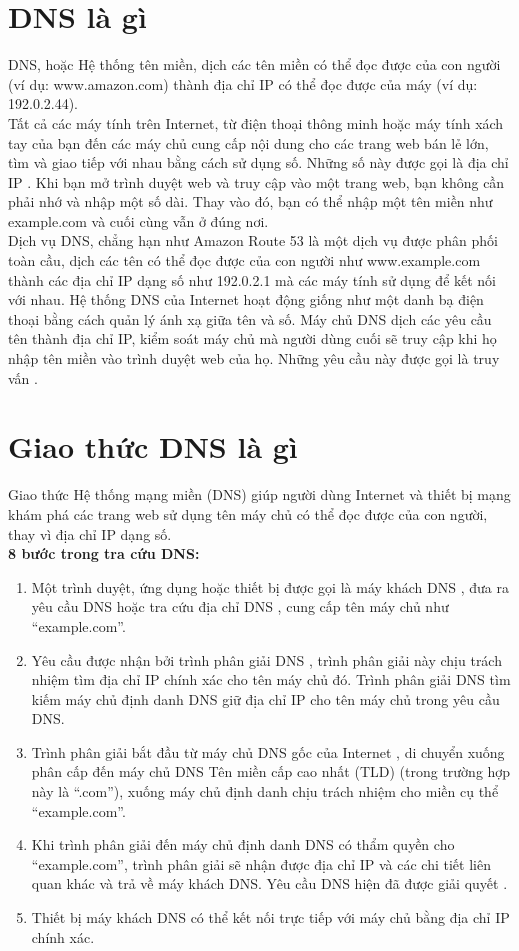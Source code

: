 \documentclass{article}
\begin{document}
\section{DNS là gì}
DNS, hoặc Hệ thống tên miền, dịch các tên miền có thể đọc được của con người (ví dụ: www.amazon.com) thành địa chỉ IP có thể đọc được của máy (ví dụ: 192.0.2.44).\\

\noindent Tất cả các máy tính trên Internet, từ điện thoại thông minh hoặc máy tính xách tay của bạn đến các máy chủ cung cấp nội dung cho các trang web bán lẻ lớn, tìm và giao tiếp với nhau bằng cách sử dụng số. Những số này được gọi là địa chỉ IP . Khi bạn mở trình duyệt web và truy cập vào một trang web, bạn không cần phải nhớ và nhập một số dài. Thay vào đó, bạn có thể nhập một tên miền như example.com và cuối cùng vẫn ở đúng nơi.\\

\noindent Dịch vụ DNS, chẳng hạn như Amazon Route 53 là một dịch vụ được phân phối toàn cầu, dịch các tên có thể đọc được của con người như www.example.com thành các địa chỉ IP dạng số như 192.0.2.1 mà các máy tính sử dụng để kết nối với nhau. Hệ thống DNS của Internet hoạt động giống như một danh bạ điện thoại bằng cách quản lý ánh xạ giữa tên và số. Máy chủ DNS dịch các yêu cầu tên thành địa chỉ IP, kiểm soát máy chủ mà người dùng cuối sẽ truy cập khi họ nhập tên miền vào trình duyệt web của họ. Những yêu cầu này được gọi là truy vấn .

\section{Giao thức DNS là gì}
Giao thức Hệ thống mạng miền (DNS) giúp người dùng Internet và thiết bị mạng khám phá các trang web sử dụng tên máy chủ có thể đọc được của con người, thay vì địa chỉ IP dạng số.\\
\textbf{8 bước trong tra cứu DNS:} \\
\begin{enumerate}
    \item Một trình duyệt, ứng dụng hoặc thiết bị được gọi là máy khách DNS , đưa ra yêu cầu DNS hoặc tra cứu địa chỉ DNS , cung cấp tên máy chủ như “example.com”.
    \item Yêu cầu được nhận bởi trình phân giải DNS , trình phân giải này chịu trách nhiệm tìm địa chỉ IP chính xác cho tên máy chủ đó. Trình phân giải DNS tìm kiếm máy chủ định danh DNS giữ địa chỉ IP cho tên máy chủ trong yêu cầu DNS.
    \item Trình phân giải bắt đầu từ máy chủ DNS gốc của Internet , di chuyển xuống phân cấp đến máy chủ DNS Tên miền cấp cao nhất (TLD) (trong trường hợp này là “.com”), xuống máy chủ định danh chịu trách nhiệm cho miền cụ thể “example.com”.
    \item Khi trình phân giải đến máy chủ định danh DNS có thẩm quyền cho “example.com”, trình phân giải sẽ nhận được địa chỉ IP và các chi tiết liên quan khác và trả về máy khách DNS. Yêu cầu DNS hiện đã được giải quyết .
    \item Thiết bị máy khách DNS có thể kết nối trực tiếp với máy chủ bằng địa chỉ IP chính xác.
    
\end{enumerate}
\end{document}
